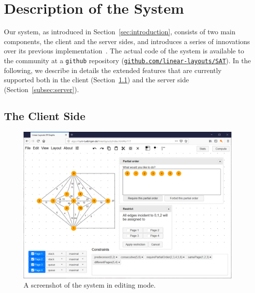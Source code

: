 \documentclass[runningheads]{llncs}
\newcommand\rurl[1]{\href{http://#1}{\nolinkurl{#1}}}
\begin{document}
 
\section{Description of the System}
\label{sec:system}

Our system, as introduced in Section~\ref{sec:introduction}, consists of two main components, the client and the server sides, and introduces a series of innovations over its previous implementation~\cite{bob}. The actual code of the system is available to the community at a \texttt{github} repository (\rurl{github.com/linear-layouts/SAT}). In the following, we describe in details the extended features that are currently supported both in the client (Section~\ref{subsec:client}) and the server side (Section~\ref{subsec:server}). 

\subsection{The Client Side}
\label{subsec:client}

\begin{figure}[t]
	\centering
	\includegraphics[width=\textwidth]{editingmode}
	\caption{A screenshot of the system in editing mode.}
	\label{fig:editingmode}
\end{figure}
\end{document}
